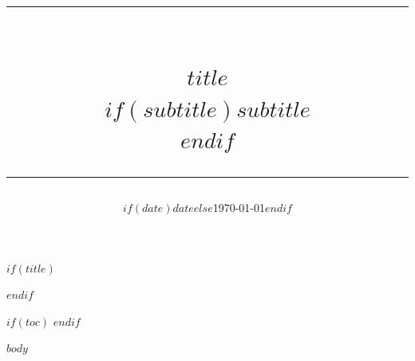 \documentclass[11pt, a4paper]{article}
\title{%
  {\textcolor{accent}{\rule{\textwidth}{2pt}}}\\[1em]%
  {\Huge\textbf{\textcolor{textprimary}{$title$}}}\\[0.5em]%
  $if(subtitle)${\Large\textcolor{textsecondary}{$subtitle$}}\\[0.5em]$endif$%
  {\textcolor{accent}{\rule{\textwidth}{2pt}}}%
}
\date{$if(date)$$date$$else$\today$endif$}
\begin{document}
$if(title)$
\maketitle
\thispagestyle{empty}
\newpage
$endif$

$if(toc)$
\tableofcontents
\newpage
$endif$

$body$
\end{document}

